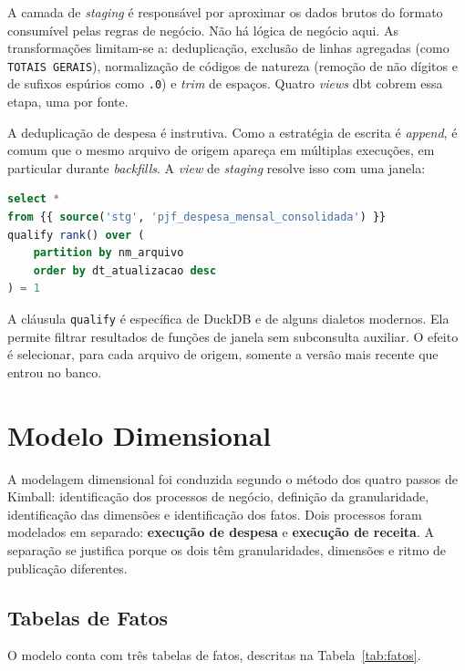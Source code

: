 A camada de \textit{staging} é responsável por aproximar os dados brutos do formato consumível pelas regras de negócio. Não há lógica de negócio aqui. As transformações limitam-se a: deduplicação, exclusão de linhas agregadas (como \texttt{TOTAIS GERAIS}), normalização de códigos de natureza (remoção de não dígitos e de sufixos espúrios como \texttt{.0}) e \textit{trim} de espaços. Quatro \textit{views} dbt cobrem essa etapa, uma por fonte.

A deduplicação de despesa é instrutiva. Como a estratégia de escrita é \textit{append}, é comum que o mesmo arquivo de origem apareça em múltiplas execuções, em particular durante \textit{backfills}. A \textit{view} de \textit{staging} resolve isso com uma janela:

\begin{singlespacing}
\begin{lstlisting}[language=SQL,basicstyle=\ttfamily\small,frame=single,breaklines=true]
select *
from {{ source('stg', 'pjf_despesa_mensal_consolidada') }}
qualify rank() over (
    partition by nm_arquivo
    order by dt_atualizacao desc
) = 1
\end{lstlisting}
\end{singlespacing}

A cláusula \texttt{qualify} é específica de DuckDB e de alguns dialetos modernos. Ela permite filtrar resultados de funções de janela sem subconsulta auxiliar. O efeito é selecionar, para cada arquivo de origem, somente a versão mais recente que entrou no banco.

\section{Modelo Dimensional}

A modelagem dimensional foi conduzida segundo o método dos quatro passos de Kimball: identificação dos processos de negócio, definição da granularidade, identificação das dimensões e identificação dos fatos. Dois processos foram modelados em separado: \textbf{execução de despesa} e \textbf{execução de receita}. A separação se justifica porque os dois têm granularidades, dimensões e ritmo de publicação diferentes.

\subsection{Tabelas de Fatos}

O modelo conta com três tabelas de fatos, descritas na Tabela~\ref{tab:fatos}.


